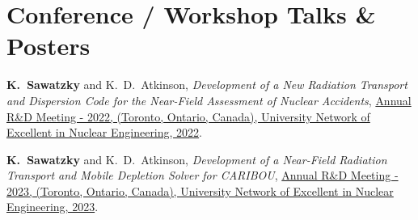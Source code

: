 \section*{\textbf{Conference / Workshop Talks \& Posters}}
\begin{enumerate}
{
    \item \textbf{K.\ Sawatzky} and {K.\ D.\ Atkinson}, \textit{Development of a New Radiation Transport and Dispersion Code for the Near-Field Assessment of Nuclear Accidents}, \href{https://unene.ca/rd-workshop-2022/}{Annual R\&D Meeting - 2022, (Toronto, Ontario, Canada), University Network of Excellent in Nuclear Engineering, 2022}.
    
    \item \textbf{K.\ Sawatzky} and {K.\ D.\ Atkinson}, \textit{Development of a Near-Field Radiation Transport and Mobile Depletion Solver for CARIBOU}, \href{https://unene.ca/rd-workshop-2023/}{Annual R\&D Meeting - 2023, (Toronto, Ontario, Canada), University Network of Excellent in Nuclear Engineering, 2023}.
}
\end{enumerate}



%